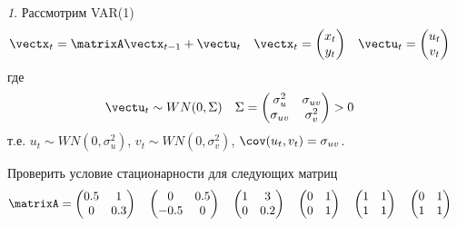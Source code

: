\documentclass[12pt]{article}
\theoremstyle{remark}
\newtheorem{exercise}{}[subsection]
\begin{document}
\begin{exercise}
Рассмотрим VAR(1)
\begin{align*}
	\vectx_t&=\matrixA\vectx_{t-1}+\vectu_t &
	\vectx_t&=\begin{pmatrix} x_t \\ y_t \end{pmatrix} &
	\vectu_t&=\begin{pmatrix} u_t \\ v_t \end{pmatrix}
\end{align*}
где 
\begin{align*}
	\vectu_t&\sim WN(0,\Sigma) &
	\Sigma&=\begin{pmatrix}
	\sigma^2_u & \sigma_{uv} \\ \sigma_{uv} & \sigma^2_v
	\end{pmatrix}>0
\end{align*}
т.е. $u_t\sim WN(0,\sigma_u^2)$,   $v_t\sim WN(0,\sigma_v^2)$,
$\cov(u_t,v_t)=\sigma_{uv}$. 
	
Проверить условие стационарности для следующих матриц
\begin{align*}
	\matrixA&=\begin{pmatrix} 0.5 & 1 \\ 0 & 0.3 \end{pmatrix} &
	&\begin{pmatrix} 0 & 0.5 \\ -0.5 & 0 \end{pmatrix} &
	& \begin{pmatrix} 1 & 3 \\ 0 & 0.2  \end{pmatrix} &
	& \begin{pmatrix} 0 & 1 \\ 0 & 1  \end{pmatrix} &
	& \begin{pmatrix} 1 & 1 \\ 1 & 1  \end{pmatrix} &
	& \begin{pmatrix} 0 & 1 \\ 1 & 1  \end{pmatrix}
\end{align*}
\end{exercise}
	
\end{document}
